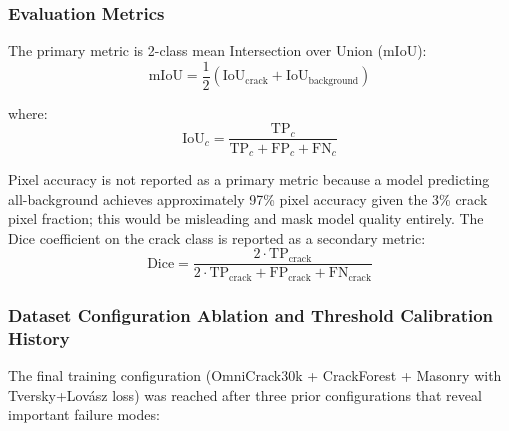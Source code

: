 \documentclass[12pt,a4paper]{article}
\begin{document}
\subsubsection{Evaluation Metrics}

The primary metric is 2-class mean Intersection over Union (mIoU):
\begin{equation}
\text{mIoU} = \frac{1}{2}\left(\text{IoU}_\text{crack} + \text{IoU}_\text{background}\right)
\end{equation}

where:
\begin{equation}
\text{IoU}_c = \frac{\text{TP}_c}{\text{TP}_c + \text{FP}_c + \text{FN}_c}
\end{equation}

Pixel accuracy is not reported as a primary metric because a model predicting all-background achieves approximately 97\% pixel accuracy given the 3\% crack pixel fraction; this would be misleading and mask model quality entirely. The Dice coefficient on the crack class is reported as a secondary metric:
\begin{equation}
\text{Dice} = \frac{2 \cdot \text{TP}_\text{crack}}{2 \cdot \text{TP}_\text{crack} + \text{FP}_\text{crack} + \text{FN}_\text{crack}}
\end{equation}

\subsubsection{Dataset Configuration Ablation and Threshold Calibration History}
\label{sec:seg_ablation}

The final training configuration (OmniCrack30k + CrackForest + Masonry with Tversky+Lov\'{a}sz loss) was reached after three prior configurations that reveal important failure modes:
\end{document}
